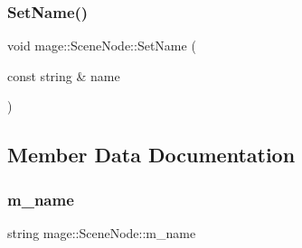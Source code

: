 \hypertarget{classmage_1_1_scene_node_a11a6d53a9ba637813b34347b68ad08d6}{}\label{classmage_1_1_scene_node_a11a6d53a9ba637813b34347b68ad08d6} 
\subsubsection{\texorpdfstring{Set\+Name()}{SetName()}}
{\footnotesize\ttfamily void mage\+::\+Scene\+Node\+::\+Set\+Name (\begin{DoxyParamCaption}\item[{const string \&}]{name }\end{DoxyParamCaption})}



\subsection{Member Data Documentation}
\hypertarget{classmage_1_1_scene_node_a3ba13ec190df3e020c89d2ace0301dec}{}\label{classmage_1_1_scene_node_a3ba13ec190df3e020c89d2ace0301dec} 
\subsubsection{\texorpdfstring{m\+\_\+name}{m\_name}}
{\footnotesize\ttfamily string mage\+::\+Scene\+Node\+::m\+\_\+name\hspace{0.3cm}{\ttfamily [private]}}

